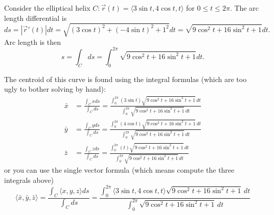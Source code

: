 Consider the elliptical helix $C\colon\vec r (t) = \langle3\sin t, 4\cos t,
t\rangle$ for $0\leq t\leq 2\pi$.  The arc length differential is $$ds = |\vec
r'(t)|dt = \sqrt{(3\cos t)^2 + (-4\sin t)^2+1^2}dt = \sqrt{9\cos^2
t+16\sin^2 t+1}dt.$$ Arc length is then  $$s=\int_C ds =
\int_{0}^{2\pi}\sqrt{9\cos^2 t+16\sin^2 t+1}dt.$$

The centroid of this curve is found using the integral formulas (which
are too ugly to bother solving by hand):
\begin{align*}
\bar x &= \frac{\int_C x ds}{\int_C ds} = \frac{\int_{0}^{2\pi}(3\sin
t)\sqrt{9\cos^2 t+16\sin^2 t+1}\,dt}{\int_{0}^{2\pi}\sqrt{9\cos^2 t+16\sin^2
t+1}\,dt}\\
\bar y &= \frac{\int_C y ds}{\int_C ds} = \frac{\int_{0}^{2\pi}(4\cos
t)\sqrt{9\cos^2 t+16\sin^2 t+1}\,dt}{\int_{0}^{2\pi}\sqrt{9\cos^2 t+16\sin^2
t+1}\,dt}\\
\bar z &= \frac{\int_C z ds}{\int_C ds} = \frac{\int_{0}^{2\pi}(t)\sqrt{9\cos^2
t+16\sin^2 t+1}\,dt}{\int_{0}^{2\pi}\sqrt{9\cos^2 t+16\sin^2 t+1}\,dt}
\end{align*}
or you can use the single vector formula (which means compute the
three integrals above) 
$$\langle\bar x,\bar y,\bar z\rangle = \frac{\int_C \langle x,y,z\rangle
ds}{\int_C ds} = \frac{\int_{0}^{2\pi} \langle3\sin t, 4\cos t,
t\rangle\sqrt{9\cos^2 t+16\sin^2 t+1}\,dt}{\int_{0}^{2\pi}\sqrt{9\cos^2
t+16\sin^2 t+1}\,dt}$$

